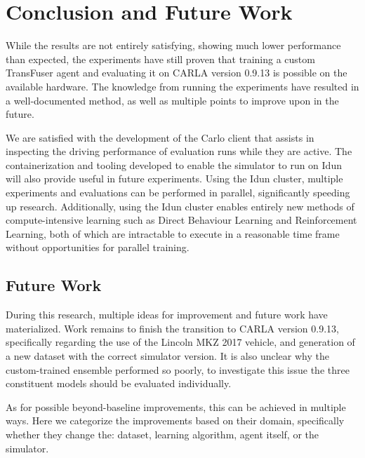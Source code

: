 \chapter{Conclusion and Future Work}
\label{chap:conclusion}


While the results are not entirely satisfying,
showing much lower performance than expected,
the experiments have still proven that training a custom TransFuser agent
and evaluating it on CARLA version 0.9.13
is possible on the available hardware.
The knowledge from running the experiments
have resulted in a well-documented method,
as well as multiple points to improve upon in the future.

We are satisfied with the development of the Carlo client
that assists in inspecting the driving performance of evaluation runs while they are active.
The containerization and tooling developed to enable the simulator to run on Idun
will also provide useful in future experiments.
Using the Idun cluster,
multiple experiments and evaluations can be performed in parallel,
significantly speeding up research.
Additionally, using the Idun cluster enables entirely new methods of compute-intensive learning
such as Direct Behaviour Learning and Reinforcement Learning,
both of which are intractable to execute in a reasonable time frame without opportunities for parallel training.


\section{Future Work}

During this research,
multiple ideas for improvement and future work have materialized.
Work remains to finish the transition to CARLA version 0.9.13,
specifically regarding the use of the Lincoln MKZ 2017 vehicle,
and generation of a new dataset with the correct simulator version.
It is also unclear why the custom-trained ensemble performed so poorly,
to investigate this issue the three constituent models should be evaluated individually.

As for possible beyond-baseline improvements,
this can be achieved in multiple ways.
Here we categorize the improvements based on their domain,
specifically whether they change the:
dataset,
learning algorithm,
agent itself,
or the simulator.

